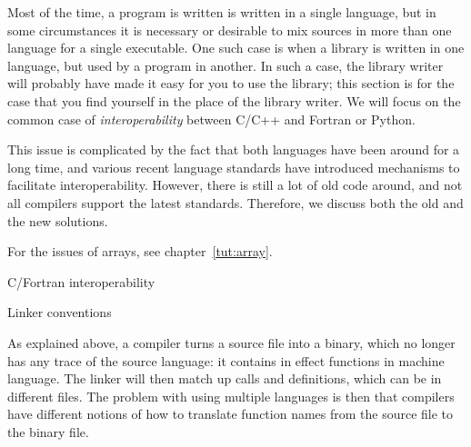 

Most of the time, a program is written is written in a single
language, but in some circumstances it is necessary or desirable to
mix sources in more than one language for a single executable. One
such case is when a library is written in one language, but used by a
program in another. In such a case, the library writer will probably
have made it easy for you to use the library; this section is for the
case that you find yourself in the place of the library writer. We
will focus on the common case of \emph{interoperability} between C/C++ and
Fortran or Python.

This issue is complicated by the fact that both languages have
been around for a long time, and various recent language standards
have introduced mechanisms to facilitate interoperability.
However, there is still a lot of old code around, and not all compilers
support the latest standards. Therefore, we discuss both the old 
and the new solutions.

For the issues of arrays, see chapter~\ref{tut:array}.

 {C/Fortran interoperability}

 {Linker conventions}

As explained above, a compiler turns a source file into a binary,
which no longer has any trace of the source language: it contains in
effect functions in machine language. The linker will then match up
calls and definitions, which can be in different files. The problem
with using multiple languages is then that compilers have different
notions of how to translate function names from the source file to the
binary file.

